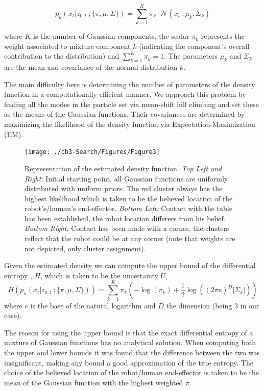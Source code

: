\begin{equation}\label{eq:gmm1}
  p_u(x_t|z_{0:t}\: ;\{\pi,\mu,\Sigma\}) = \sum\limits_{k=1}^{K} \pi_{k} \cdot \mathcal{N}(x_t\: ;\mu_{k},\Sigma_{k} )
\end{equation}

where $K$ is the number of Gaussian components,  the scalar $\pi_{k}$ represents the weight associated to mixture component $k$ (indicating the component's overall contribution to the
distribution) and $\sum_{k=1}^{K} \pi_{k} = 1$. The parameters $\mu_{k}$ and $\Sigma_{k}$ are the mean and covariance of the normal distribution $k$. 

The main difficulty here is determining the number of parameters of the density function in a computationally efficient manner.
We approach this problem by finding all the modes in the particle set via mean-shift hill climbing and set these as the means of the Gaussian functions. Their
covariances are determined by maximizing the likelihood of the density function via Expectation-Maximization (EM). 
%
%

\begin{figure}
 \centering
   \texttt{[image: ./ch3-Search/Figures/Figure3]}
  \caption{Representation of the estimated density function. \textit{Top Left and Right:} Initial starting point, 
  all Gaussian functions are uniformly distributed with uniform priors. The red cluster always has the highest likelihood which is taken
  to be the believed location of the robot's/human's end-effector. \textit{Bottom Left:} Contact with the table has been established, the robot location differers
  from his belief. \textit{Bottom Right:} Contact has been made with a corner, the clusters reflect that the robot could be at any corner (note that weights are not 
  depicted, only cluster assignment).}
  \label{fig:clustering}
\end{figure}

Given the estimated density we can compute the upper bound of the differential entropy \cite{DiffEntropyHuber2008}, $H$, 
which is taken to be the uncertainty $U$,
\begin{equation}
  H\left(  p_u(x_t|z_{0:t}\: ;\{\pi,\mu,\Sigma\}) \right) = \sum\limits_{k=1}^{K} \pi_{k} \left( -\log(\pi_{k}) + \frac{1}{2} \log((2\pi e)^{D} |\Sigma_{k}|) \right)
\end{equation}
where $e$ is the base of the natural logarithm and $D$ the dimension (being 3 in our case).

The reason for using the upper bound is that the exact differential entropy of a mixture of Gaussian functions has no 
analytical solution. When computing both the
upper and lower bounds it was found that the difference between the two was insignificant, making any bound a good approximation 
of the true entropy. The choice of the believed location of the robot/human end-effector is taken to be the mean of the 
Gaussian function with the highest weighted $\pi$.

